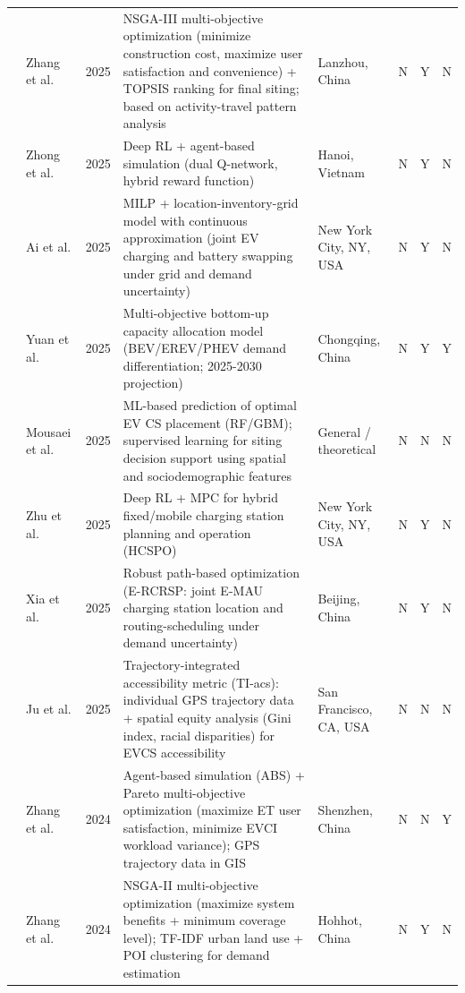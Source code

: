 \documentclass[letterpaper, 12pt, oneside, doublespacing]{Thesis}
\begin{document}
\begin{longtable}{L{0.9cm} L{1.8cm} L{0.7cm} L{2.5cm} L{2.1cm} L{0.7cm} L{0.7cm} L{0.7cm}}
\cite{optimization_of_2025} & Zhang et al. & 2025 & NSGA-III multi-objective optimization (minimize construction cost, maximize user satisfaction and convenience) + TOPSIS ranking for final siting; based on activity-travel pattern analysis & Lanzhou, China & N & Y & N \\
\cite{optimizing_electric_2025} & Zhong et al. & 2025 & Deep RL + agent-based simulation (dual Q-network, hybrid reward function) & Hanoi, Vietnam & N & Y & N \\
\cite{optimizing_urban_2025} & Ai et al. & 2025 & MILP + location-inventory-grid model with continuous approximation (joint EV charging and battery swapping under grid and demand uncertainty) & New York City, NY, USA & N & Y & N \\
\cite{planning_future_2025} & Yuan et al. & 2025 & Multi-objective bottom-up capacity allocation model (BEV/EREV/PHEV demand differentiation; 2025-2030 projection) & Chongqing, China & N & Y & Y \\
\cite{predicting_optimal_2025} & Mousaei et al. & 2025 & ML-based prediction of optimal EV CS placement (RF/GBM); supervised learning for siting decision support using spatial and sociodemographic features & General {\slash} theoretical & N & N & N \\
\cite{reinforcement_learning_2025} & Zhu et al. & 2025 & Deep RL + MPC for hybrid fixed/mobile charging station planning and operation (HCSPO) & New York City, NY, USA & N & Y & N \\
\cite{robust_charging_2025} & Xia et al. & 2025 & Robust path-based optimization (E-RCRSP: joint E-MAU charging station location and routing-scheduling under demand uncertainty) & Beijing, China & N & Y & N \\
\cite{trajectory-integrated_accessibility_2025} & Ju et al. & 2025 & Trajectory-integrated accessibility metric (TI-acs): individual GPS trajectory data + spatial equity analysis (Gini index, racial disparities) for EVCS accessibility & San Francisco, CA, USA & N & N & N \\
\cite{a_data-driven_2024} & Zhang et al. & 2024 & Agent-based simulation (ABS) + Pareto multi-objective optimization (maximize ET user satisfaction, minimize EVCI workload variance); GPS trajectory data in GIS & Shenzhen, China & N & N & Y \\
\cite{a_multi-objective_2024} & Zhang et al. & 2024 & NSGA-II multi-objective optimization (maximize system benefits + minimum coverage level); TF-IDF urban land use + POI clustering for demand estimation & Hohhot, China & N & Y & N \\

\end{longtable}
\end{document}
